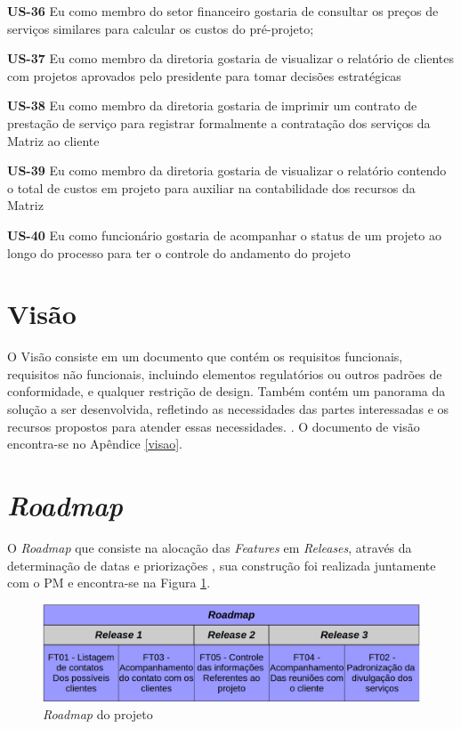 \textbf{US-36} Eu como membro do setor financeiro gostaria de consultar os preços de serviços similares para calcular os custos do pré-projeto;


\textbf{US-37} Eu como membro da diretoria gostaria de visualizar o relatório de clientes com projetos aprovados pelo presidente para tomar decisões estratégicas


\textbf{US-38} Eu como membro da diretoria gostaria de imprimir um contrato de prestação de serviço para registrar formalmente a contratação dos serviços da Matriz ao cliente


\textbf{US-39} Eu como membro da diretoria gostaria de visualizar o relatório contendo o total de custos em projeto para auxiliar na contabilidade dos recursos da Matriz


\textbf{US-40} Eu como funcionário gostaria de acompanhar o status de um projeto ao longo do processo para ter o controle do andamento do projeto

\section{Visão}

O Visão consiste em um documento que contém os requisitos funcionais, requisitos não funcionais, incluindo elementos regulatórios 
ou outros padrões de conformidade, e qualquer restrição de design. Também contém um panorama da solução a ser desenvolvida, 
refletindo as necessidades das partes interessadas e os recursos propostos para atender essas necessidades. \cite{safe}. 
O documento de visão encontra-se no Apêndice \ref{visao}.

\section{\textit{Roadmap}}

O \textit{Roadmap} que consiste na alocação das \textit{Features} em \textit{Releases}, através da determinação de datas e priorizações \cite{safe}, sua construção foi 
realizada juntamente com o PM e encontra-se na Figura \ref{roadmap}.

\begin{figure}[!h]
\centering
\includegraphics[scale=0.4]{figuras/roadmap.png}
\caption{\textit{Roadmap} do projeto}
\label{roadmap}
\end{figure}

